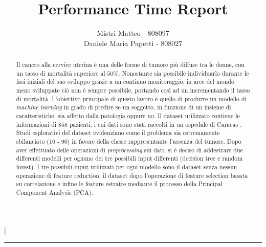 \documentclass[a4paper, 12pt, conference]{ieeeconf}
\title{\LARGE \bf
Performance Time Report
}
\author{Mistri Matteo - 808097\\
	Daniele Maria Papetti - 808027
}
\begin{document}
\twocolumn[
\begin{@twocolumnfalse} 
\maketitle
\thispagestyle{empty}
\pagestyle{empty}
\rule{\textwidth}{.5pt}
\begin{abstract}

Il cancro alla cervice uterina è una delle forme di tumore più diffuse tra le donne, con un tasso di mortalità superiore al $50\%$.
Nonostante sia possibile individuarlo durante le fasi iniziali del suo sviluppo grazie a un continuo monitoraggio, in aree del mondo meno sviluppate ciò non è sempre possibile, portando così ad un incrementando il tasso di mortalità.
L'obiettivo principale di questo lavoro è quello di produrre un modello di \textit{machine learning} in grado di predire se un soggetto, in funzione di un insieme di caratteristiche, sia affetto dalla patologia oppure no.
Il dataset utilizzato contiene le informazioni di $858$ pazienti, i cui dati sono stati raccolti in un ospedale di Caracas \cite{ML}.
Studi esplorativi del dataset evidenziano come il problema sia estremamente sbilanciato (10 - 90) in favore della classe rappresentante l'assenza del tumore.
Dopo aver effettuato delle operazioni di \textit{preprocessing} sui dati, si è deciso di addestrare due differenti modelli per ognuno dei tre possibili input differenti (decision tree e random forest).
I tre possibili input utilizzati per ogni modello sono il dataset senza nessun operazione di feature reduction, il dataset dopo l'operazione di feature selection basata su correlazione e infine le feature estratte mediante il processo della Principal Component Analysis (PCA).

\end{abstract}
\end{@twocolumnfalse}
\end{document}

